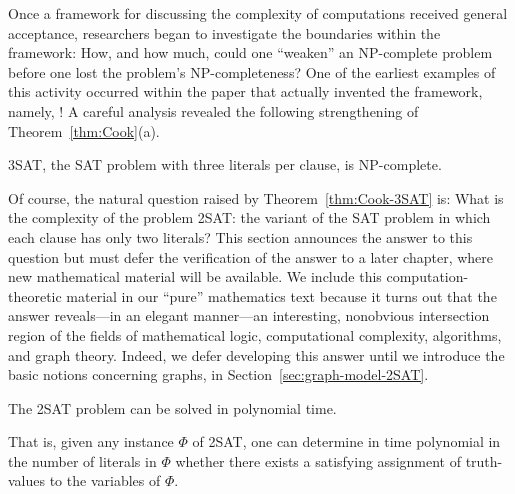 {Once a framework for discussing the complexity of computations received general acceptance, researchers began to investigate the boundaries within the framework: How, and how much, could one ``weaken'' an {\sf NP}-complete problem before one lost the problem's {\sf NP}-completeness?  One of the earliest examples of this activity occurred within the paper that actually invented the framework, namely, \cite{Cook71}!  A careful analysis revealed the following strengthening of Theorem~\ref{thm:Cook}(a).

\begin{theorem}
\label{thm:Cook-3SAT}
{\sf 3SAT}, the {\sf SAT} problem with three literals per clause, is {\sf NP}-complete.
\end{theorem}


Of course, the natural question raised by Theorem~\ref{thm:Cook-3SAT} is: What is the complexity of the problem {\sf 2SAT}: the variant  of the {\sf SAT} problem in which each clause has only two literals?  This section announces the answer to this question but must defer the verification of the answer to a later chapter, where new mathematical material will be available.  We include this computation-theoretic material in our ``pure'' mathematics text because it turns out that the answer reveals---in an elegant manner---an interesting, nonobvious intersection region of the fields of mathematical logic, computational complexity, algorithms, and graph theory.  Indeed, we defer developing this answer until we  introduce the basic notions concerning graphs, in Section~\ref{sec:graph-model-2SAT}.

\begin{prop}
\label{thm:2SAT}
The {\sf 2SAT} problem can be solved in polynomial time.

\smallskip

\noindent
That is, given any instance $\Phi$ of {\sf 2SAT}, one can determine in time polynomial in the number of literals in $\Phi$ whether there exists a satisfying assignment of truth-values to the variables of $\Phi$.
\end{prop}

}
